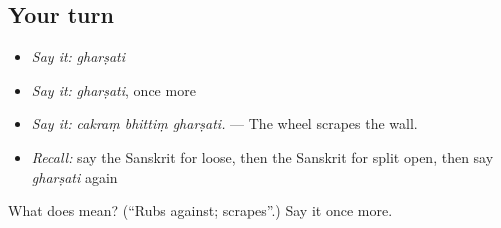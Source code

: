 \subsection*{Your turn}
\begin{itemize}
\raggedright
  \item \emph{Say it:} \emph{gharṣati}
  \item \emph{Say it:} \emph{gharṣati}, once more
  \item \emph{Say it:} \emph{cakraṃ bhittiṃ gharṣati.} — The wheel scrapes the wall.
  \item \emph{Recall:} say the Sanskrit for loose, then the Sanskrit for split open, then say \emph{gharṣati} again
\end{itemize}

\begin{tcolorbox}[breakable,colback=teal!4,colframe=teal!35!black,title={Before you move on}]
What does  mean? (\textquotedblleft{}Rubs against; scrapes\textquotedblright{}.) Say it once more.
\end{tcolorbox}
